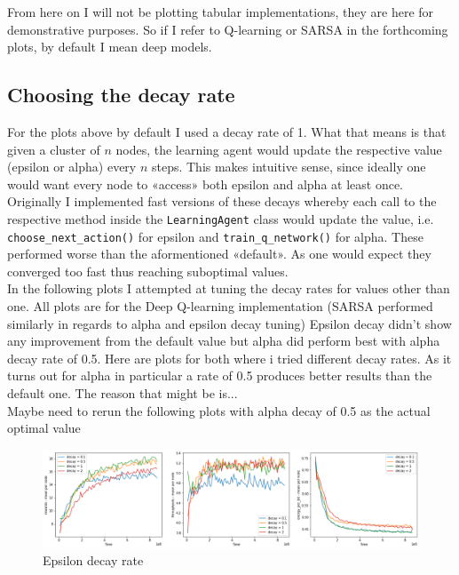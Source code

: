 From here on I will not be plotting tabular 
implementations, they are here for demonstrative 
purposes. So if I refer to Q-learning or SARSA
in the forthcoming plots, by default I mean deep
models. 

\subsection{Choosing the decay rate}

For the plots above by default I used a decay rate of 
1. What that means is that given a cluster of $n$ nodes,
the learning agent would update the respective value 
(epsilon or alpha) every $n$ steps. This makes intuitive
sense, since ideally one would want every node to 
«access» both epsilon and alpha at least once. 
Originally I implemented fast versions of these decays
whereby each call to the respective method inside the 
\texttt{LearningAgent} class would update the value, 
i.e. \texttt{choose\_next\_action()} for epsilon and 
\texttt{train\_q\_network()} for alpha. These performed
worse than the aformentioned «default». As one would 
expect they converged too fast thus reaching suboptimal 
values.\\

In the following plots I attempted at tuning the decay
rates for values other than one. All plots are for the Deep Q-learning implementation (SARSA performed similarly in regards to 
alpha and epsilon decay tuning) Epsilon decay didn't show any improvement from the default value but alpha did perform best with alpha decay rate of 0.5.
Here are plots for both where i tried different decay rates. As it turns out for alpha in particular a rate of 0.5 produces better results than the default 
one. The reason that might be is...\\

Maybe need to rerun the following plots with alpha decay of 0.5 
as the actual optimal value

\begin{figure}[H]
\centering
\hspace*{-1.1cm}  
\includegraphics[scale=0.40]{plots/decays/epsilon_deep_q_SMALL.png}
  \caption{Epsilon decay rate}
\end{figure}

